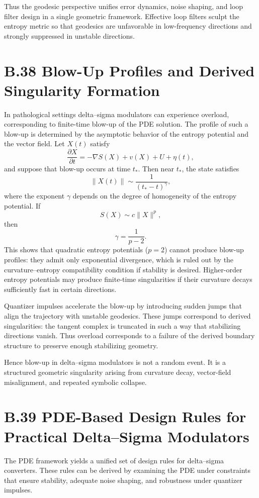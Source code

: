Thus the geodesic perspective unifies error dynamics, noise shaping, and loop filter design in a single geometric framework. Effective loop filters sculpt the entropy metric so that geodesics are unfavorable in low-frequency directions and strongly suppressed in unstable directions.

\section{B.38 Blow-Up Profiles and Derived Singularity Formation}

In pathological settings delta–sigma modulators can experience overload, corresponding to finite-time blow-up of the PDE solution. The profile of such a blow-up is determined by the asymptotic behavior of the entropy potential and the vector field. Let \(X(t)\) satisfy
\[
\frac{\partial X}{\partial t}
= -\nabla S(X) + v(X) + U + \eta(t),
\]
and suppose that blow-up occurs at time \(t_{\ast}\). Then near \(t_{\ast}\), the state satisfies
\[
\|X(t)\| \sim \frac{1}{(t_{\ast} - t)^{\gamma}},
\]
where the exponent \(\gamma\) depends on the degree of homogeneity of the entropy potential. If
\[
S(X) \sim c\|X\|^{p},
\]
then
\[
\gamma = \frac{1}{p-2}.
\]
This shows that quadratic entropy potentials (\(p=2\)) cannot produce blow-up profiles: they admit only exponential divergence, which is ruled out by the curvature–entropy compatibility condition if stability is desired. Higher-order entropy potentials may produce finite-time singularities if their curvature decays sufficiently fast in certain directions.

Quantizer impulses accelerate the blow-up by introducing sudden jumps that align the trajectory with unstable geodesics. These jumps correspond to derived singularities: the tangent complex is truncated in such a way that stabilizing directions vanish. Thus overload corresponds to a failure of the derived boundary structure to preserve enough stabilizing geometry.

Hence blow-up in delta–sigma modulators is not a random event. It is a structured geometric singularity arising from curvature decay, vector-field misalignment, and repeated symbolic collapse.

\section{B.39 PDE-Based Design Rules for Practical Delta–Sigma Modulators}

The PDE framework yields a unified set of design rules for delta–sigma converters. These rules can be derived by examining the PDE under constraints that ensure stability, adequate noise shaping, and robustness under quantizer impulses.

